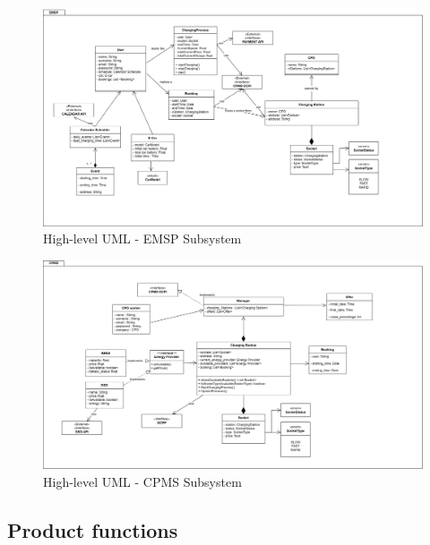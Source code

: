 \documentclass[table, 12pt]{article} %
\begin{document}
            \begin{center}
                \begin{figure}[H]
                    \includegraphics[scale=0.55, center]{assets/UML_EMSP.png}
                    \caption{High-level UML - EMSP Subsystem}
                    \label{fig: UML EMSP}
                \end{figure}
            \end{center}
            \newpage
            \begin{center}
                \begin{figure}[H]
                    \includegraphics[scale=0.55, center]{assets/UML_CPMS.png}
                    \caption{High-level UML - CPMS Subsystem}
                    \label{fig: UML CPMS}
                \end{figure}
            \end{center}

    \newpage
    \subsection{Product functions}
    \label{product_functions}
   
\end{document}
